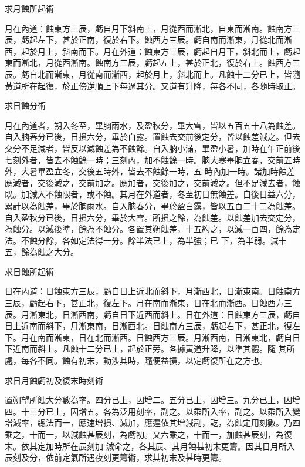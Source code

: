 \begin{pinyinscope}
 求月蝕所起術



 月在內道：蝕東方三辰，虧自月下斜南上，月從西而漸北，自東而漸南。蝕南方三辰，虧起左下，甚於正南，復於右下。蝕西方三辰。虧自南而漸東，月從北而漸西，起於月上，斜南而下。月在外道：蝕東方三辰，虧起自月下，斜北而上，虧起東而漸北，月從西漸南。蝕南方三辰，虧起左上，甚於正北，復於右上。蝕西方三辰。虧自北而漸東，月從南而漸西，起於月上，斜北而上。凡蝕十二分已上，皆隨黃道所在起復，於正傍逆順上下每過其分。又道有升降，每各不同，各隨時取正。



 求日蝕分術



 月在內道者，朔入冬至，畢朒雨水，及盈秋分，畢大雪，皆以五百五十八為蝕差。自入朒春分已後，日損六分，畢於白露。置蝕去交前後定分，皆以蝕差減之。但去交分不足減者，皆反以減蝕差為不蝕餘。自入朒小滿，畢盈小暑，加時在午正前後七刻外者，皆去不蝕餘一時；三刻內，加不蝕餘一時。朒大寒畢朒立春，交前五時外，大暑畢盈立冬，交後五時外，皆去不蝕餘一時，五
 時內加一時。諸加時蝕差應減者，交後減之，交前加之。應加者，交後加之，交前減之。但不足減去者，蝕既。加減入不蝕限者，或不蝕。其月在外道者，冬至初日無蝕差。自後日益六分，累計以為蝕差，畢於朒雨水。自入朒春分，畢於盈白露，皆以五百二十二為蝕差。自入盈秋分已後，日損六分，畢於大雪。所損之餘，為蝕差。以蝕差加去交定分，為蝕分。以減後準，餘為不蝕分。各置其朔蝕差，十五約之，以減一百四，餘為定法。不蝕分餘，各如定法得一分。餘半法已上，為半強；已
 下，為半弱。減十五，餘為蝕之大分。



 求日蝕所起術



 日在內道：日蝕東方三辰，虧自日上近北而斜下，月漸西北，日漸東南。日蝕南方三辰，虧起右下，甚正北，復左下。月在南而漸東，日在北而漸西。日蝕西方三辰。月漸東北，日漸西南，虧自日下近西而斜上。日在外道：日蝕東方三辰，虧自日上近南而斜下，月漸東南，日漸西北。日蝕南方三辰，虧起右下，甚正北，復左下。月在南而漸東，日在北而漸西。日蝕西方三辰。月漸西南，日漸東北，虧自日下近南而斜上。凡蝕十二分已上，起於正旁。各據黃道升降，以準其體。隨
 其所處，每各不同。蝕有初末，動涉其時，隨便益損，以定虧復所在之方也。



 求日月蝕虧初及復末時刻術



 置朔望所蝕大分數為率。四分已上，因增二。五分已上，因增三。九分已上，因增四。十三分已上，因增五。各為泛用刻率，副之。以乘所入率，副之。以乘所入變增減率，總法而一，應速增損、減加，應遲依其增減副，訖，為蝕定用刻數。乃四乘之，十而一，以減蝕甚辰刻，為虧初。又六乘之，十而一，加蝕甚辰刻，為復末。依其定加時所在辰刻加
 減命之，各其辰、其月蝕甚初末更籌。因其日月所入辰刻及分，依前定氣所遇夜刻更籌術，求其初末及甚時更籌。




\end{pinyinscope}
